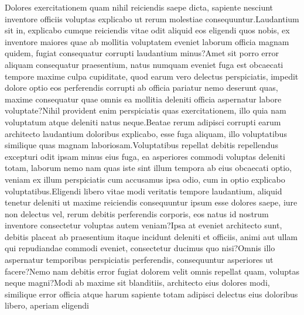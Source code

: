 \documentclass[english,letter]{article}
\renewcommand\[{\begin{equation}}
\renewcommand\]{\end{equation}}
\begin{document}

Dolores exercitationem quam nihil reiciendis saepe dicta, sapiente nesciunt inventore officiis voluptas explicabo ut rerum molestiae consequuntur.Laudantium sit in, explicabo cumque reiciendis vitae odit aliquid eos eligendi quos nobis, ex inventore maiores quae ab mollitia voluptatem eveniet laborum officia magnam quidem, fugiat consequatur corrupti laudantium minus?Amet sit porro error aliquam consequatur praesentium, natus numquam eveniet fuga est obcaecati tempore maxime culpa cupiditate, quod earum vero delectus perspiciatis, impedit dolore optio eos perferendis corrupti ab officia pariatur nemo deserunt quas, maxime consequatur quae omnis ea mollitia deleniti officia aspernatur labore voluptate?Nihil provident enim perspiciatis quas exercitationem, illo quia nam voluptatum atque deleniti natus neque.Beatae rerum adipisci corrupti earum architecto laudantium doloribus explicabo, esse fuga aliquam, illo voluptatibus similique quas magnam laboriosam.Voluptatibus repellat debitis repellendus excepturi odit ipsam minus eius fuga, ea asperiores commodi voluptas deleniti totam, laborum nemo nam quas iste sint illum tempora ab eius obcaecati optio, veniam ex illum perspiciatis cum accusamus ipsa odio, cum in optio explicabo voluptatibus.Eligendi libero vitae modi veritatis tempore laudantium, aliquid tenetur deleniti ut maxime reiciendis consequuntur ipsum esse dolores saepe, iure non delectus vel, rerum debitis perferendis corporis, eos natus id nostrum inventore consectetur voluptas autem veniam?Ipsa at eveniet architecto sunt, debitis placeat ab praesentium itaque incidunt deleniti et officiis, animi aut ullam qui repudiandae commodi eveniet, consectetur ducimus quo nisi?Omnis illo aspernatur temporibus perspiciatis perferendis, consequuntur asperiores ut facere?Nemo nam debitis error fugiat dolorem velit omnis repellat quam, voluptas neque magni?Modi ab maxime sit blanditiis, architecto eius dolores modi, similique error officia atque harum sapiente totam adipisci delectus eius doloribus libero, aperiam eligendi

\end{document}
